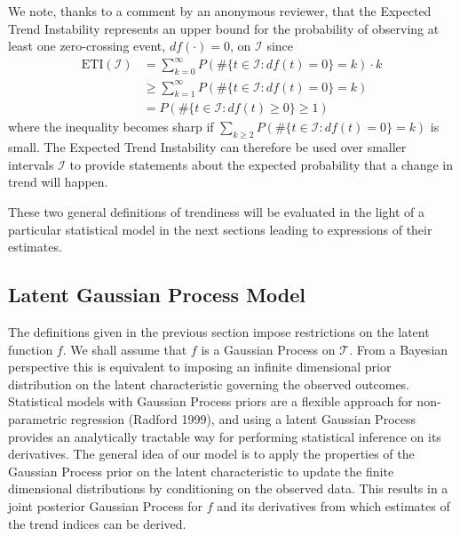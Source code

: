 \documentclass[
  11pt,
]{article}
\theoremstyle{nonumberplain}
\begin{document}
We note, thanks to a comment by an anonymous reviewer, that the Expected
Trend Instability represents an upper bound for the probability of
observing at least one zero-crossing event, \(df(\cdot) = 0\), on
\(\mathcal{I}\) since \begin{align*}
  \text{ETI}(\mathcal{I}) &= \sum_{k=0}^\infty P(\# \{t \in \mathcal{I} : df(t) = 0\} = k) \cdot k\\
  &\geq \sum_{k=1}^\infty P(\# \{t \in \mathcal{I} : df(t) = 0\} = k)\\
  &= P(\# \{t \in \mathcal{I} : df(t) \geq 0\} \geq 1)
\end{align*} where the inequality becomes sharp if
\(\sum_{k\geq2} P(\# \{t \in \mathcal{I} : df(t) = 0\} = k)\) is small.
The Expected Trend Instability can therefore be used over smaller
intervals \(\mathcal{I}\) to provide statements about the expected
probability that a change in trend will happen.

These two general definitions of trendiness will be evaluated in the
light of a particular statistical model in the next sections leading to
expressions of their estimates.

\hypertarget{latent-gaussian-process-model}{%
\subsection{Latent Gaussian Process
Model}\label{latent-gaussian-process-model}}

The definitions given in the previous section impose restrictions on the
latent function \(f\). We shall assume that \(f\) is a Gaussian Process
on \(\mathcal{T}\). From a Bayesian perspective this is equivalent to
imposing an infinite dimensional prior distribution on the latent
characteristic governing the observed outcomes. Statistical models with
Gaussian Process priors are a flexible approach for non-parametric
regression (Radford 1999), and using a latent Gaussian Process provides
an analytically tractable way for performing statistical inference on
its derivatives. The general idea of our model is to apply the
properties of the Gaussian Process prior on the latent characteristic to
update the finite dimensional distributions by conditioning on the
observed data. This results in a joint posterior Gaussian Process for
\(f\) and its derivatives from which estimates of the trend indices can
be derived.
\end{document}
